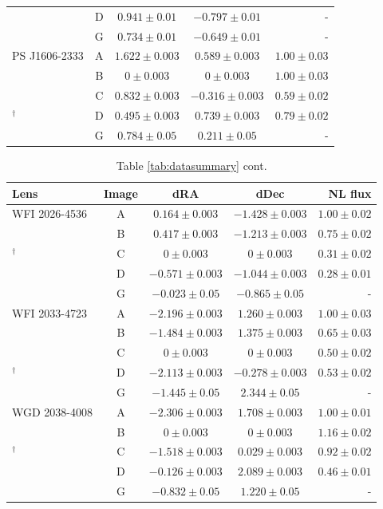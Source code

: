 \begin{table}
\begin{tabular}{lcccr}
		& D & $0.941 \pm 0.01$ & $-0.797 \pm 0.01$ & - \\
		& G & $0.734 \pm 0.01$ & $-0.649 \pm 0.01$& - \\ 
		\hline
		PS J1606-2333 & A & $1.622 \pm 0.003$& $0.589 \pm 0.003$ & $1.00 \pm 0.03$\\
		\cite{Nierenberg++19}& B & $0 \pm 0.003$& $0 \pm 0.003$ & $1.00 \pm 0.03$\\
		\cite{Shajib++18}& C & $0.832 \pm 0.003$& $-0.316 \pm 0.003$ & $0.59 \pm 0.02$ \\
		$^{\dagger}$\cite{Lemon++18}& D  & $0.495 \pm 0.003$& $0.739 \pm 0.003$ & $0.79 \pm 0.02$ \\
		& G  & $0.784 \pm 0.05$& $0.211 \pm 0.05$ & - \\
		\hline
	\end{tabular}
\end{table}
\begin{table}
	\centering
	\caption{Table \ref{tab:datasummary} cont.}
	\label{tab:datasummarycont}
	\begin{tabular}{lcccr} 
		\hline
		Lens & Image & dRA & dDec & NL flux \\
		\hline
		WFI 2026-4536 & A & $0.164 \pm 0.003$& $-1.428 \pm 0.003$ & $1.00 \pm 0.02$ \\
		\cite{Nierenberg++19}& B & $0.417\pm 0.003$& $-1.213 \pm 0.003$ & $0.75 \pm 0.02$ \\
		$^{\dagger}$\cite{Morgan++04}& C & $0\pm 0.003$& $0 \pm 0.003$ & $0.31 \pm 0.02$ \\
		& D & $-0.571 \pm 0.003$& $-1.044 \pm 0.003$ & $0.28 \pm 0.01$ \\
		& G & $-0.023 \pm 0.05$ & $-0.865 \pm 0.05$ & - \\
		\hline
		WFI 2033-4723 & A & $-2.196 \pm 0.003$& $1.260 \pm 0.003$ & $1.00 \pm 0.03$ \\
		\cite{Nierenberg++19}& B & $-1.484 \pm 0.003$& $1.375 \pm 0.003$ & $0.65 \pm 0.03$ \\
		\cite{Vuissoz++08}& C & $0\pm 0.003$& $0 \pm 0.003$ & $0.50 \pm 0.02$ \\
		$^{\dagger}$\cite{Morgan++04}& D & $-2.113 \pm 0.003$& $-0.278 \pm 0.003$ & $0.53 \pm 0.02$ \\
		& G & $-1.445 \pm 0.05$& $2.344 \pm 0.05$ & - \\
		\hline
		WGD 2038-4008 & A & $-2.306 \pm 0.003$& $1.708 \pm 0.003$ & $1.00 \pm 0.01$ \\
		\cite{Nierenberg++19}& B & $0\pm 0.003$& $0 \pm 0.003$ & $1.16 \pm 0.02$ \\
		$^{\dagger}$\cite{Agnello++18}& C & $-1.518 \pm 0.003$& $0.029 \pm 0.003$ & $0.92 \pm 0.02$ \\
		& D & $-0.126 \pm 0.003$& $2.089 \pm 0.003$ & $0.46 \pm 0.01$ \\
		& G & $-0.832 \pm 0.05$ & $1.220 \pm 0.05$ & - \\
		\hline
		
	\end{tabular}
\end{table}

%
%

